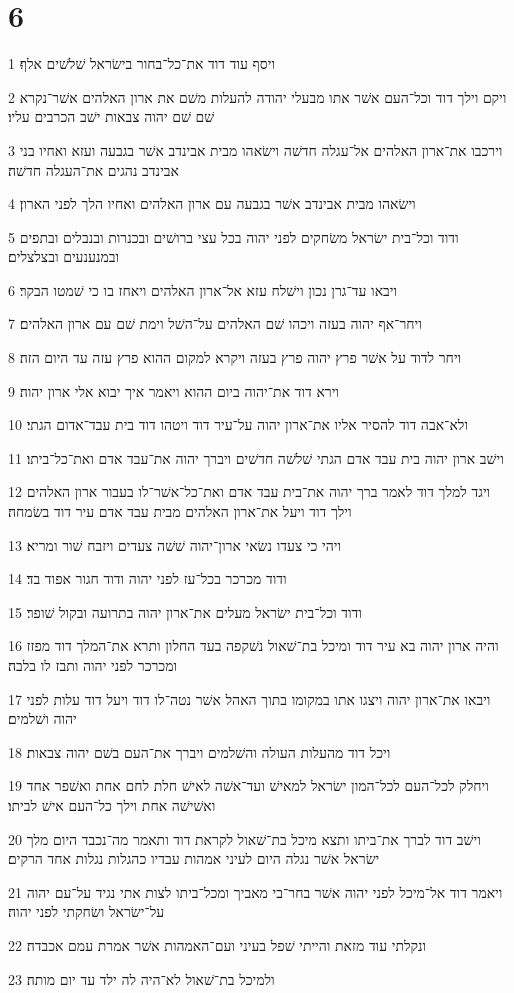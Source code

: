 \chapter{6}

\par 1 ויסף עוד דוד את־כל־בחור בישׂראל שׁלשׁים אלף׃
\par 2 ויקם וילך דוד וכל־העם אשׁר אתו מבעלי יהודה להעלות משׁם את ארון האלהים אשׁר־נקרא שׁם שׁם יהוה צבאות ישׁב הכרבים עליו׃
\par 3 וירכבו את־ארון האלהים אל־עגלה חדשׁה וישׂאהו מבית אבינדב אשׁר בגבעה ועזא ואחיו בני אבינדב נהגים את־העגלה חדשׁה׃
\par 4 וישׂאהו מבית אבינדב אשׁר בגבעה עם ארון האלהים ואחיו הלך לפני הארון׃
\par 5 ודוד וכל־בית ישׂראל משׂחקים לפני יהוה בכל עצי ברושׁים ובכנרות ובנבלים ובתפים ובמנענעים ובצלצלים׃
\par 6 ויבאו עד־גרן נכון וישׁלח עזא אל־ארון האלהים ויאחז בו כי שׁמטו הבקר׃
\par 7 ויחר־אף יהוה בעזה ויכהו שׁם האלהים על־השׁל וימת שׁם עם ארון האלהים׃
\par 8 ויחר לדוד על אשׁר פרץ יהוה פרץ בעזה ויקרא למקום ההוא פרץ עזה עד היום הזה׃
\par 9 וירא דוד את־יהוה ביום ההוא ויאמר איך יבוא אלי ארון יהוה׃
\par 10 ולא־אבה דוד להסיר אליו את־ארון יהוה על־עיר דוד ויטהו דוד בית עבד־אדום הגתי׃
\par 11 וישׁב ארון יהוה בית עבד אדם הגתי שׁלשׁה חדשׁים ויברך יהוה את־עבד אדם ואת־כל־ביתו׃
\par 12 ויגד למלך דוד לאמר ברך יהוה את־בית עבד אדם ואת־כל־אשׁר־לו בעבור ארון האלהים וילך דוד ויעל את־ארון האלהים מבית עבד אדם עיר דוד בשׂמחה׃
\par 13 ויהי כי צעדו נשׂאי ארון־יהוה שׁשׁה צעדים ויזבח שׁור ומריא׃
\par 14 ודוד מכרכר בכל־עז לפני יהוה ודוד חגור אפוד בד׃
\par 15 ודוד וכל־בית ישׂראל מעלים את־ארון יהוה בתרועה ובקול שׁופר׃
\par 16 והיה ארון יהוה בא עיר דוד ומיכל בת־שׁאול נשׁקפה בעד החלון ותרא את־המלך דוד מפזז ומכרכר לפני יהוה ותבז לו בלבה׃
\par 17 ויבאו את־ארון יהוה ויצגו אתו במקומו בתוך האהל אשׁר נטה־לו דוד ויעל דוד עלות לפני יהוה ושׁלמים׃
\par 18 ויכל דוד מהעלות העולה והשׁלמים ויברך את־העם בשׁם יהוה צבאות׃
\par 19 ויחלק לכל־העם לכל־המון ישׂראל למאישׁ ועד־אשׁה לאישׁ חלת לחם אחת ואשׁפר אחד ואשׁישׁה אחת וילך כל־העם אישׁ לביתו׃
\par 20 וישׁב דוד לברך את־ביתו ותצא מיכל בת־שׁאול לקראת דוד ותאמר מה־נכבד היום מלך ישׂראל אשׁר נגלה היום לעיני אמהות עבדיו כהגלות נגלות אחד הרקים׃
\par 21 ויאמר דוד אל־מיכל לפני יהוה אשׁר בחר־בי מאביך ומכל־ביתו לצות אתי נגיד על־עם יהוה על־ישׂראל ושׂחקתי לפני יהוה׃
\par 22 ונקלתי עוד מזאת והייתי שׁפל בעיני ועם־האמהות אשׁר אמרת עמם אכבדה׃
\par 23 ולמיכל בת־שׁאול לא־היה לה ילד עד יום מותה׃

